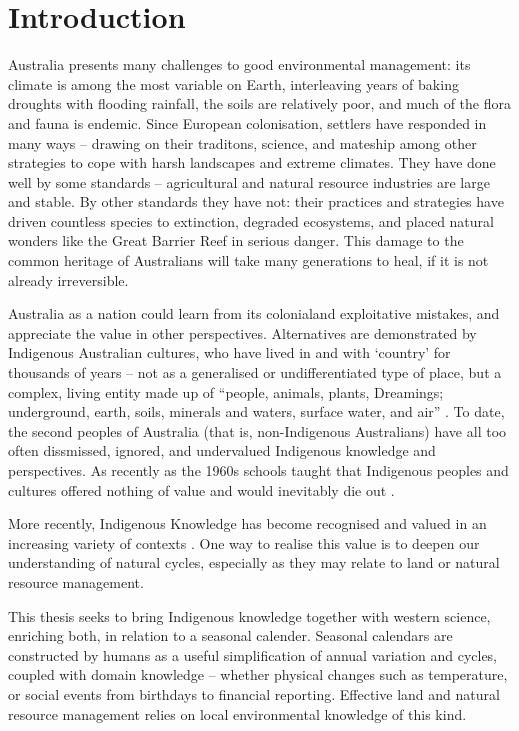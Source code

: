 \chapter{Introduction}
\label{ch:introduction}

Australia presents many challenges to good environmental management: its
climate is among the most variable on Earth, interleaving years of baking
droughts with flooding rainfall, the soils are relatively poor, and much of
the flora and fauna is endemic.
%
Since European colonisation, settlers have responded in many ways --
drawing on their traditons, science, and mateship among other strategies to cope
with harsh landscapes and extreme climates.
%
They have done well by some standards -- agricultural and natural
resource industries are large and stable.  By other standards they have not:
their practices and strategies have driven countless species to extinction,
degraded ecosystems, and placed natural wonders like the Great Barrier Reef
in serious danger.  This damage to the common heritage of Australians will
take many generations to heal, if it is not already irreversible.

Australia as a nation could learn from its colonialand exploitative mistakes,
and appreciate the value in other perspectives.  Alternatives are demonstrated
by Indigenous Australian cultures, who have lived in and with `country' for
thousands of years -- not as a generalised or undifferentiated
type of place, but a complex, living entity made up of ``people, animals,
plants, Dreamings; underground, earth, soils, minerals and waters, surface
water, and air'' \citep{birdrose1996}.
%
To date, the second peoples of Australia (that is, non-Indigenous Australians)
have all too often dissmissed, ignored, and undervalued Indigenous knowledge
and perspectives.  As recently as the 1960s schools taught that Indigenous
peoples and cultures offered nothing of value and would inevitably die out
\citep{flannery1994}.


More recently, Indigenous Knowledge has become recognised and valued in an
increasing variety of contexts \citep[eg.][]{petheram2010,cochran2015,
berkes2012}.  One way to realise this value is to deepen our understanding
of natural cycles, especially as they may relate to land or natural resource
management.

This thesis seeks to bring Indigenous knowledge together with
western science, enriching both, in relation to a seasonal calender.
Seasonal calendars are constructed by humans as a useful simplification of
annual variation and cycles, coupled with domain knowledge -- whether
physical changes such as temperature, or social events from birthdays to
financial reporting.  Effective land and natural resource management relies on
local environmental knowledge of this kind.

